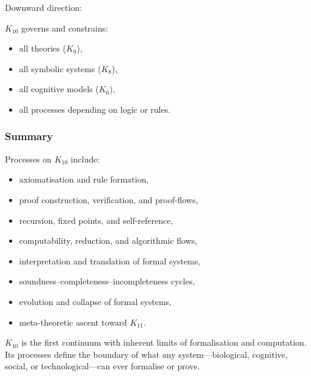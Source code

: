 Downward direction:

$K_{10}$ governs and constrains:
\begin{itemize}
    \item all theories ($K_9$),
    \item all symbolic systems ($K_8$),
    \item all cognitive models ($K_6$),
    \item all processes depending on logic or rules.
\end{itemize}

\subsubsection{Summary}

Processes on $K_{10}$ include:
\begin{itemize}
    \item axiomatisation and rule formation,
    \item proof construction, verification, and proof-flows,
    \item recursion, fixed points, and self-reference,
    \item computability, reduction, and algorithmic flows,
    \item interpretation and translation of formal systems,
    \item soundness–completeness–incompleteness cycles,
    \item evolution and collapse of formal systems,
    \item meta-theoretic ascent toward $K_{11}$.
\end{itemize}

$K_{10}$ is the first continuum with inherent 
limits of formalisation and computation.  
Its processes define the boundary of what any system—biological, 
cognitive, social, or technological—can ever formalise or prove.
